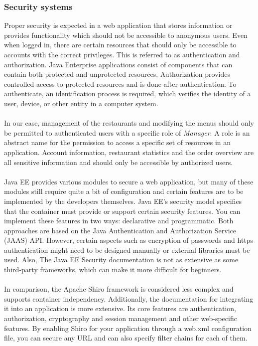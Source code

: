 \documentclass[12pt]{article}
\begin{document}
\begin{multicols}{2}
\subsubsection{Security systems}
Proper security is expected in a web application that stores information or provides functionality which should not be accessible to anonymous users. Even when logged in, there are certain resources that should only be accessible to accounts with the correct privileges. This is referred to as authentication and authorization. Java Enterprise applications consist of components that can contain both protected and unprotected resources.  Authorization provides controlled access to protected resources and is done after authentication. To authenticate, an identification process is required, which verifies the identity of a user, device, or other entity in a computer system.
\\\\
In our case, management of the restaurants and modifying the menus should only be permitted to authenticated users with a specific role of \textit{Manager}. A role is an abstract name for the permission to access a specific set of resources in an application. Account information, restaurant statistics and the order overview are all sensitive information and should only be accessible by authorized users. 
\\\\
Java EE provides various modules to secure a web application, but many of these modules still require quite a bit of configuration and certain features are to be implemented by the developers themselves. \cite{JavaEESecurity29:online} Java EE’s security model specifies that the container must provide or support certain security features. You can implement these features in two ways: declarative and programmatic. Both approaches are based on the Java Authentication and Authorization Service (JAAS) API. However, certain aspects such as encryption of passwords and https authentication might need to be designed manually or external libraries must be used. Also, The Java EE Security documentation is not as extensive as some third-party frameworks, which can make it more difficult for beginners.
\\\\
In comparison, the Apache Shiro framework is considered less complex and supports container independency. Additionally, the documentation for integrating it into an application is more extensive. Its core features are authentication, authorization, cryptography and session management and other web-specific features. By enabling Shiro for your application through a web.xml configuration file, you can secure any URL and can also specify filter chains for each of them. \cite{javaSecurityComparison84:online}

\end{multicols}
\end{document}
